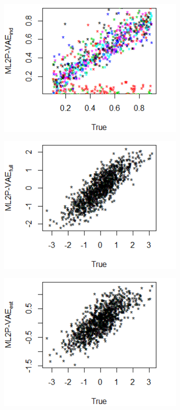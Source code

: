 \begin{figure}[h]
\begin{subfigure}{.32\textwidth}
      \includegraphics[width=.9\linewidth]{img/ml_journal_results/20skills/vae_ind_disc_20skills.png}
    \end{subfigure}
    \begin{subfigure}{.32\textwidth}
      \centering
      \includegraphics[width=.9\linewidth]{img/ml_journal_results/20skills/vae_full_theta_20skills.png}
    \end{subfigure}
    \begin{subfigure}{.32\textwidth}
      \centering
      \includegraphics[width=.9\linewidth]{img/ml_journal_results/20skills/vae_est_theta_20skills.png}

\end{subfigure}
\end{figure}
